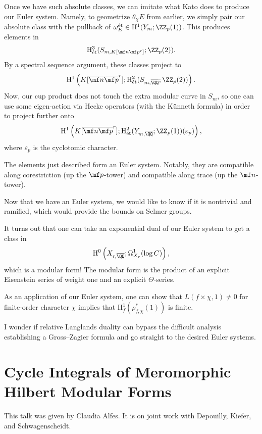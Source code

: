 \documentclass{article}
\begin{document}
Once we have such absolute classes, we can imitate what Kato does to produce our Euler system. Namely, to geometrize $\theta_\chi E$ from earlier, we simply pair our absolute class with the pullback of $\omega_E^{\mathrm{\acute et}}\in\mathrm H^1(Y_m;\ZZ_p(1))$. This produces elements in
\[\mathrm H^3_{\mathrm{\acute et}}(S_{m,K[\mf n\mf p^r]};\ZZ_p(2)).\]
By a spectral sequence argument, these classes project to
\[\mathrm H^1\left(K[\overline{\mf n}\overline{\mf p}^r];\mathrm H^2_{\mathrm{\acute et}}(S_{m,\overline\QQ};\ZZ_p(2))\right).\]
Now, our cup product does not touch the extra modular curve in $S_m$, so one can use some eigen-action via Hecke operators (with the K\"unneth formula) in order to project further onto
\[\mathrm H^1\left(K[\overline{\mf n}\overline{\mf p}^r];\mathrm H^2_{\mathrm{\acute et}}(Y_{m,\overline\QQ};\ZZ_p(1))(\varepsilon_p)\right),\]
where $\varepsilon_p$ is the cyclotomic character.
\begin{theorem}
	The elements just described form an Euler system. Notably, they are compatible along corestriction (up the $\mf p$-tower) and compatible along trace (up the $\mf n$-tower).
\end{theorem}
Now that we have an Euler system, we would like to know if it is nontrivial and ramified, which would provide the bounds on Selmer groups.
\begin{remark}
	It turns out that one can take an exponential dual of our Euler system to get a class in
	\[\mathrm H^0\left(X_{r,\overline\QQ};\Omega^1_{X_r}(\log C)\right),\]
	which is a modular form! The modular form is the product of an explicit Eisenstein series of weight one and an explicit $\Theta$-series.
\end{remark}
As an application of our Euler system, one can show that $L(f\times\chi,1)\ne0$ for finite-order character $\chi$ implies that $\mathrm H^1_f(\rho^*_{f,\chi}(1))$ is finite.
\begin{idea}
	I wonder if relative Langlands duality can bypass the difficult analysis establishing a Gross--Zagier formula and go straight to the desired Euler systems.
\end{idea}

\section{Cycle Integrals of Meromorphic Hilbert Modular Forms}
This talk was given by Claudia Alfes. It is on joint work with Depouilly, Kiefer, and Schwagenscheidt.
\end{document}

